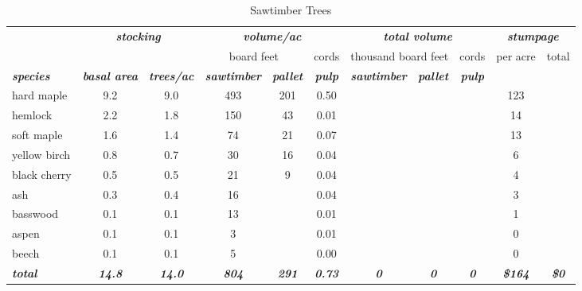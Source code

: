\documentclass[landscape]{article}
\begin{document}
\begin{table}[H]

\caption{\label{tab:unnamed-chunk-5}Sawtimber Trees}
\fontsize{10}{12}\selectfont
\begin{tabular}[t]{lcccccccccc}
\toprule
\multicolumn{1}{c}{\em{\textbf{ }}} & \multicolumn{2}{c}{\em{\textbf{stocking}}} & \multicolumn{3}{c}{\em{\textbf{volume/ac }}} & \multicolumn{3}{c}{\em{\textbf{total volume}}} & \multicolumn{2}{c}{\em{\textbf{stumpage}}} \\
\cmidrule(l{3pt}r{3pt}){2-3} \cmidrule(l{3pt}r{3pt}){4-6} \cmidrule(l{3pt}r{3pt}){7-9} \cmidrule(l{3pt}r{3pt}){10-11}
\multicolumn{3}{c}{ } & \multicolumn{2}{c}{board feet} & \multicolumn{1}{c}{cords} & \multicolumn{2}{c}{thousand board feet} & \multicolumn{1}{c}{cords} & \multicolumn{1}{c}{per acre} & \multicolumn{1}{c}{total} \\
\cmidrule(l{3pt}r{3pt}){4-5} \cmidrule(l{3pt}r{3pt}){6-6} \cmidrule(l{3pt}r{3pt}){7-8} \cmidrule(l{3pt}r{3pt}){9-9} \cmidrule(l{3pt}r{3pt}){10-10} \cmidrule(l{3pt}r{3pt}){11-11}
\rowcolor[HTML]{DCDCDC}  \em{\textbf{species}} & \em{\textbf{basal area}} & \em{\textbf{trees/ac}} & \em{\textbf{sawtimber}} & \em{\textbf{pallet}} & \em{\textbf{pulp}} & \em{\textbf{sawtimber}} & \em{\textbf{pallet}} & \em{\textbf{pulp}} & \em{\textbf{ }} & \em{\textbf{ }}\\
\midrule
\rowcolor{gray!6}  hard maple & 9.2 & 9.0 & 493 & 201 & 0.50 &  &  &  & 123 & \\
 
hemlock & 2.2 & 1.8 & 150 & 43 & 0.01 &  &  &  & 14 & \\
 
\rowcolor{gray!6}  soft maple & 1.6 & 1.4 & 74 & 21 & 0.07 &  &  &  & 13 & \\
 
yellow birch & 0.8 & 0.7 & 30 & 16 & 0.04 &  &  &  & 6 & \\
 
\rowcolor{gray!6}  black cherry & 0.5 & 0.5 & 21 & 9 & 0.04 &  &  &  & 4 & \\
 
ash & 0.3 & 0.4 & 16 &  & 0.04 &  &  &  & 3 & \\
 
\rowcolor{gray!6}  basswood & 0.1 & 0.1 & 13 &  & 0.01 &  &  &  & 1 & \\
 
aspen & 0.1 & 0.1 & 3 &  & 0.01 &  &  &  & 0 & \\
 
\rowcolor{gray!6}  beech & 0.1 & 0.1 & 5 &  & 0.00 &  &  &  & 0 & \\
 
\rowcolor[HTML]{DCDCDC}  \em{\textbf{total}} & \em{\textbf{14.8}} & \em{\textbf{14.0}} & \em{\textbf{804}} & \em{\textbf{291}} & \em{\textbf{0.73}} & \em{\textbf{0}} & \em{\textbf{0}} & \em{\textbf{0}} & \em{\textbf{\$164}} & \em{\textbf{\$0}}\\
\bottomrule
\end{tabular}
\end{table}
\end{document}
